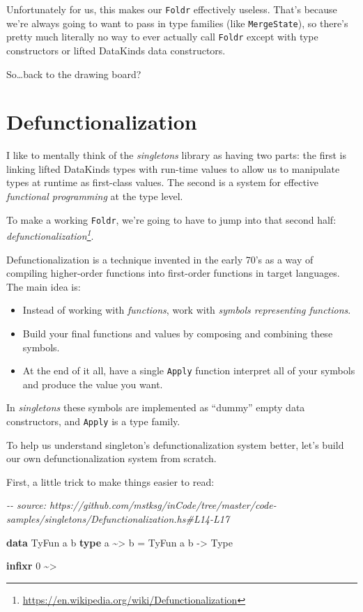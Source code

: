 \documentclass[]{article}
\newenvironment{Shaded}{}{}
\newcommand{\CommentTok}[1]{\textcolor[rgb]{0.38,0.63,0.69}{\textit{#1}}}
\newcommand{\DataTypeTok}[1]{\textcolor[rgb]{0.56,0.13,0.00}{#1}}
\newcommand{\DecValTok}[1]{\textcolor[rgb]{0.25,0.63,0.44}{#1}}
\newcommand{\KeywordTok}[1]{\textcolor[rgb]{0.00,0.44,0.13}{\textbf{#1}}}
\newcommand{\NormalTok}[1]{#1}
\newcommand{\OperatorTok}[1]{\textcolor[rgb]{0.40,0.40,0.40}{#1}}
\newcommand{\OtherTok}[1]{\textcolor[rgb]{0.00,0.44,0.13}{#1}}
\renewcommand{\href}[2]{#2\footnote{\url{#1}}}
\begin{document}
Unfortunately for us, this makes our \texttt{Foldr} effectively useless. That's
because we're always going to want to pass in type families (like
\texttt{MergeState}), so there's pretty much literally no way to ever actually
call \texttt{Foldr} except with type constructors or lifted DataKinds data
constructors.

So\ldots back to the drawing board?

\section{Defunctionalization}\label{defunctionalization}

I like to mentally think of the \emph{singletons} library as having two parts:
the first is linking lifted DataKinds types with run-time values to allow us to
manipulate types at runtime as first-class values. The second is a system for
effective \emph{functional programming} at the type level.

To make a working \texttt{Foldr}, we're going to have to jump into that second
half:
\emph{\href{https://en.wikipedia.org/wiki/Defunctionalization}{defunctionalization}}.

Defunctionalization is a technique invented in the early 70's as a way of
compiling higher-order functions into first-order functions in target languages.
The main idea is:

\begin{itemize}
\tightlist
\item
  Instead of working with \emph{functions}, work with \emph{symbols representing
  functions}.
\item
  Build your final functions and values by composing and combining these
  symbols.
\item
  At the end of it all, have a single \texttt{Apply} function interpret all of
  your symbols and produce the value you want.
\end{itemize}

In \emph{singletons} these symbols are implemented as ``dummy'' empty data
constructors, and \texttt{Apply} is a type family.

To help us understand singleton's defunctionalization system better, let's build
our own defunctionalization system from scratch.

First, a little trick to make things easier to read:

\begin{Shaded}
\begin{Highlighting}[]
\CommentTok{{-}{-} source: https://github.com/mstksg/inCode/tree/master/code{-}samples/singletons/Defunctionalization.hs\#L14{-}L17}

\KeywordTok{data} \DataTypeTok{TyFun}\NormalTok{ a b}
\KeywordTok{type}\NormalTok{ a }\OperatorTok{\textasciitilde{}\textgreater{}}\NormalTok{ b }\OtherTok{=} \DataTypeTok{TyFun}\NormalTok{ a b }\OtherTok{{-}\textgreater{}} \DataTypeTok{Type}

\KeywordTok{infixr} \DecValTok{0} \OperatorTok{\textasciitilde{}\textgreater{}}
\end{Highlighting}
\end{Shaded}
\end{document}
